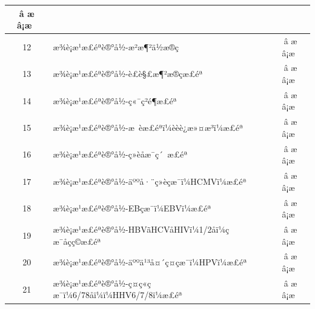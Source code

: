 \documentclass[UTF8,10pt,a4paper,fontset=fandol]{ctexart}
\newcommand{\fieldvalue}[1]{#1}
\newcommand{\handwritten}[1]{#1}
\begin{document}
\begin{center}
\begin{tabularx}{\textwidth}{|c|X|c|}
\fieldvalue{\handwritten{â æ}} \quad â¡æ  \\
\hline
12 & æ¾è¡æ¹æ£éªè®°å½-æ²æ¶²ä½æ®ç &
\fieldvalue{\handwritten{â æ}} \quad â¡æ  \\
\hline
13 & æ¾è¡æ¹æ£éªè®°å½-è£è§£æ¶²æ®çæ£éª &
\fieldvalue{\handwritten{â æ}} \quad â¡æ  \\
\hline
14 & æ¾è¡æ¹æ£éªè®°å½-ç«¯ç²é¶æ£éª &
\fieldvalue{\handwritten{â æ}} \quad â¡æ  \\
\hline
15 & æ¾è¡æ¹æ£éªè®°å½-æ èæ£éªï¼èèè¿æ»¤æ³ï¼æ£éª &
\fieldvalue{\handwritten{â æ}} \quad â¡æ  \\
\hline
16 & æ¾è¡æ¹æ£éªè®°å½-ç»èåæ¯ç´ æ£éª &
\fieldvalue{\handwritten{â æ}} \quad â¡æ  \\
\hline
17 & æ¾è¡æ¹æ£éªè®°å½-äººå·¨ç»èçæ¯ï¼HCMVï¼æ£éª &
\fieldvalue{\handwritten{â æ}} \quad â¡æ  \\
\hline
18 & æ¾è¡æ¹æ£éªè®°å½-EBçæ¯ï¼EBVï¼æ£éª &
\fieldvalue{\handwritten{â æ}} \quad â¡æ  \\
\hline
19 & æ¾è¡æ¹æ£éªè®°å½-HBVãHCVåHIVï¼1/2åï¼çæ¯åçç©æ£éª &
\fieldvalue{\handwritten{â æ}} \quad â¡æ  \\
\hline
20 & æ¾è¡æ¹æ£éªè®°å½-äººä¹³å¤´ç¤çæ¯ï¼HPVï¼æ£éª &
\fieldvalue{\handwritten{â æ}} \quad â¡æ  \\
\hline
21 & æ¾è¡æ¹æ£éªè®°å½-ç¤ç«çæ¯ï¼6/78åï¼ï¼HHV6/7/8ï¼æ£éª &
\fieldvalue{\handwritten{â æ}} \quad â¡æ  \\

\end{tabularx}
\end{center}
\end{document}
